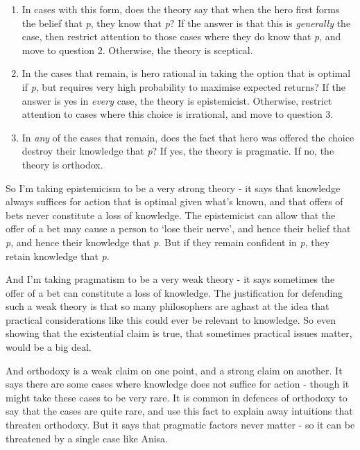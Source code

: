 \documentclass[
  11pt,
]{book}
\providecommand{\tightlist}{%
  \setlength{\itemsep}{0pt}\setlength{\parskip}{0pt}}
\begin{document}
\begin{enumerate}
\def\labelenumi{\arabic{enumi}.}
\tightlist
\item
  In cases with this form, does the theory say that when the hero first forms the belief that \emph{p}, they know that \emph{p}? If the answer is that this is \emph{generally} the case, then restrict attention to those cases where they do know that \emph{p}, and move to question 2. Otherwise, the theory is sceptical.
\item
  In the cases that remain, is hero rational in taking the option that is optimal if \emph{p}, but requires very high probability to maximise expected returns? If the answer is yes in \emph{every} case, the theory is epistemicist. Otherwise, restrict attention to cases where this choice is irrational, and move to question 3.
\item
  In \emph{any} of the cases that remain, does the fact that hero was offered the choice destroy their knowledge that \emph{p}? If yes, the theory is pragmatic. If no, the theory is orthodox.
\end{enumerate}

So I'm taking epistemicism to be a very strong theory - it says that knowledge always suffices for action that is optimal given what's known, and that offers of bets never constitute a loss of knowledge. The epistemicist can allow that the offer of a bet may cause a person to `lose their nerve', and hence their belief that \emph{p}, and hence their knowledge that \emph{p}. But if they remain confident in \emph{p}, they retain knowledge that \emph{p}.

And I'm taking pragmatism to be a very weak theory - it says sometimes the offer of a bet can constitute a loss of knowledge. The justification for defending such a weak theory is that so many philosophers are aghast at the idea that practical considerations like this could ever be relevant to knowledge. So even showing that the existential claim is true, that sometimes practical issues matter, would be a big deal.

And orthodoxy is a weak claim on one point, and a strong claim on another. It says there are some cases where knowledge does not suffice for action - though it might take these cases to be very rare. It is common in defences of orthodoxy to say that the cases are quite rare, and use this fact to explain away intuitions that threaten orthodoxy. But it says that pragmatic factors never matter - so it can be threatened by a single case like Anisa.
\end{document}
